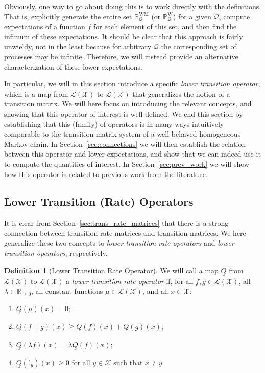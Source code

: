 \documentclass[10pt]{paper}
\theoremstyle{definition}
\newtheorem{definition}{Definition}
\newcommand{\reals}{\mathbb{R}}
\newcommand{\realsnonneg}{\reals_{\geq 0}}
\newcommand{\states}{\mathcal{X}}
\newcommand{\processes}{\mathbb{P}}
\newcommand{\wprocesses}{\processes^{\mathrm{W}}}
\newcommand{\wmprocesses}{\processes^{\mathrm{WM}}}
\newcommand{\gambles}{\mathcal{L}}
\newcommand{\gamblesX}{\gambles(\states)}
\newcommand{\ind}[1]{\mathbb{I}_{#1}}
\newcommand{\rateset}{\mathcal{Q}}
\newcommand{\lrate}{\underline{Q}}
\begin{document}
Obviously, one way to go about doing this is to work directly with the definitions. That is, explicitly generate the entire set $\wmprocesses_\rateset$ (or $\wprocesses_\rateset$) for a given $\rateset$, compute expectations of a function $f$ for each element of this set, and then find the infimum of these expectations. It should be clear that this approach is fairly unwieldy, not in the least because for arbitrary $\rateset$ the corresponding set of processes may be infinite. Therefore, we will instead provide an alternative characterization of these lower expectations. 

In particular, we will in this section introduce a specific \emph{lower transition operator}, which is a map from $\gamblesX$ to $\gamblesX$ that generalizes the notion of a transition matrix. We will here focus on introducing the relevant concepts, and showing that this operator of interest is well-defined. We end this section by establishing that this (family) of operators is in many ways intuitively comparable to the transition matrix system of a well-behaved homogeneous Markov chain. In Section~\ref{sec:connections} we will then establish the relation between this operator and lower expectations, and show that we can indeed use it to compute the quantities of interest. In Section~\ref{sec:prev_work} we will show how this operator is related to previous work from the literature.

\subsection{Lower Transition (Rate) Operators}

It is clear from Section~\ref{sec:trans_rate_matrices} that there is a strong connection between transition rate matrices and transition matrices. We here generalize these two concepts to \emph{lower transition rate operators} and \emph{lower transition operators}, respectively.

\begin{definition}[Lower Transition Rate Operator]\label{def:coh_low_trans_rate}
We will call a map $\lrate$ from $\gamblesX$ to $\gamblesX$ a \emph{lower transition rate operator} if, for all $f,g\in\gamblesX$, all $\lambda\in\realsnonneg$, all constant functions $\mu\in\gamblesX$, and all $x\in\states$:

\begin{enumerate}[label=LR\arabic*:,ref=LR\arabic*]
\item\label{LR:constantzero}
$\lrate(\mu)(x)=0$;
\item\label{LR:subadditive}
$\lrate(f+g)(x)\geq\lrate(f)(x)+\lrate(g)(x)$;
\item\label{LR:homo}
$\lrate(\lambda f)(x)=\lambda\lrate(f)(x)$;
\item\label{LR:nondiagpos}
$\lrate(\ind{y})(x)\geq0$ for all $y\in\states$ such that $x\neq y$.
\end{enumerate}
\vspace{5pt}
\end{definition}
\end{document}
